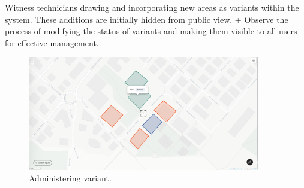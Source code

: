 Witness technicians drawing and incorporating new areas as variants within the system.
These additions are initially hidden from public view.
+ Observe the process of modifying the status of variants and making them visible to all users for effective management.
\begin{figure}[H]
    \centering
    \includegraphics[width=0.9\textwidth]{res/web/4-draw polygons}
    \caption{Administering variant.}
    \label{fig:web-create-var}
\end{figure}





